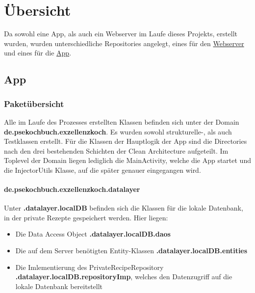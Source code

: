 \chapter{Übersicht}

Da sowohl eine App, als auch ein Webserver im Laufe dieses Projekts, erstellt wurden, wurden unterschiedliche Repositories angelegt, eines für den \href{https://github.com/wlauppe/kochbuchserver}{Webserver} und eines für die \href{https://github.com/wlauppe/kochbuchapp}{App}.

\section{App}

\subsection{Paketübersicht}
Alle im Laufe des Prozesses erstellten Klassen befinden sich unter der Domain \\ \textbf{de.psekochbuch.exzellenzkoch}. Es wurden sowohl strukturelle-, als auch Testklassen erstellt.
Für die Klassen der Hauptlogik der App sind die Directories nach den drei bestehenden Schichten der Clean Architecture aufgeteilt. Im Toplevel der Domain liegen lediglich die MainActivity, welche die App startet und die InjectorUtils Klasse, auf die später genauer eingegangen wird.

\subsubsection{de.psekochbuch.exzellenzkoch.datalayer}

Unter \textbf{.datalayer.localDB} befinden sich die Klassen für die lokale Datenbank, in der private Rezepte gespeichert werden. Hier liegen:
\begin{itemize}
	\item Die Data Access Object \textbf{.datalayer.localDB.daos}
	\item Die auf dem Server benötigten Entity-Klassen \textbf{.datalayer.localDB.entities}
	\item Die Imlementierung des PrivateRecipeRepository \textbf{.datalayer.localDB.repositoryImp}, welches den Datenzugriff auf die lokale Datenbank bereitstellt
\end{itemize}

